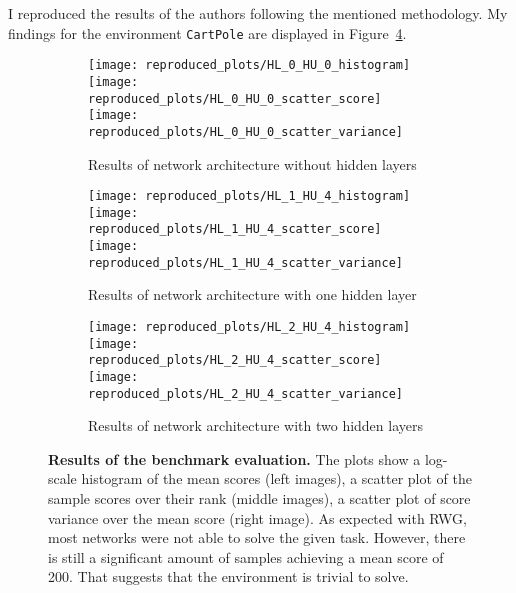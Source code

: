 I reproduced the results of the authors following the mentioned methodology. My findings for the environment \verb|CartPole| are displayed in Figure~\ref{fig:plots_reproduced}.
\begin{figure}[ht]
\centering
\begin{subfigure}{\textwidth}
  \centering
  \texttt{[image: reproduced\_plots/HL\_0\_HU\_0\_histogram]}
  \texttt{[image: reproduced\_plots/HL\_0\_HU\_0\_scatter\_score]}
  \texttt{[image: reproduced\_plots/HL\_0\_HU\_0\_scatter\_variance]}
    \caption{Results of network architecture without hidden layers}
    \label{fig:plots_reproduced_first}
\end{subfigure}
\begin{subfigure}{\textwidth}
  \centering
  \texttt{[image: reproduced\_plots/HL\_1\_HU\_4\_histogram]}
  \texttt{[image: reproduced\_plots/HL\_1\_HU\_4\_scatter\_score]}
  \texttt{[image: reproduced\_plots/HL\_1\_HU\_4\_scatter\_variance]}
    \caption{Results of network architecture with one hidden layer}
    \label{fig:plots_reproduced_second}
\end{subfigure}
\begin{subfigure}{\textwidth}
  \centering
  \texttt{[image: reproduced\_plots/HL\_2\_HU\_4\_histogram]}
  \texttt{[image: reproduced\_plots/HL\_2\_HU\_4\_scatter\_score]}
  \texttt{[image: reproduced\_plots/HL\_2\_HU\_4\_scatter\_variance]}
    \caption{Results of network architecture with two hidden layers}
    \label{fig:plots_reproduced_third}
\end{subfigure}
\caption[Reproduced Plots]{
  \textbf{Results of the benchmark evaluation.}
   The plots show a log-scale histogram of the mean scores (left images), a scatter plot of the sample scores over their rank (middle images), a scatter plot of score variance over the mean score (right image). As expected with RWG, most networks were not able to solve the given task. However, there is still a significant amount of samples achieving a mean score of 200. That suggests that the environment is trivial to solve.
}
\label{fig:plots_reproduced}
\end{figure}
